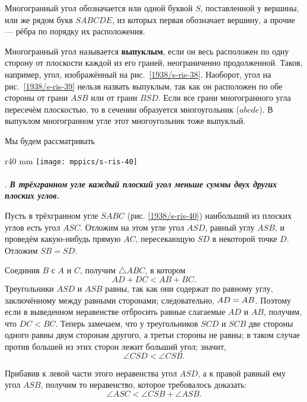 Многогранный угол обозначается или одной буквой $S$, поставленной у вершины, или же рядом букв $SABCDE$, из которых первая обозначает вершину, а прочие — рёбра по порядку их расположения.

Многогранный угол называется \textbf{выпуклым}, если он весь расположен по одну сторону от плоскости каждой из его граней, неограниченно продолженной.
Таков, например, угол, изображённый на рис.~\ref{1938/s-ris-38}.
Наоборот, угол на рис.~\ref{1938/s-ris-39} нельзя назвать выпуклым, так как он расположен по обе стороны от грани $ASB$ или от грани $BSD$.
Если все грани многогранного угла пересечём плоскостью, то в сечении образуется многоугольник ($abcde$).
В выпуклом многогранном угле этот многоугольник тоже выпуклый.

Мы будем рассматривать 

{

\begin{wrapfigure}{r}{40 mm}
\vskip-9mm
\centering
\texttt{[image: mppics/s-ris-40]}
\caption{}\label{1938/s-ris-40}
\end{wrapfigure}

\paragraph{}\label{1938/s50}
\mbox{.}
\textbf{\emph{В трёхгранном угле каждый плоский угол меньше суммы двух других плоских углов.}}

Пусть в трёхгранном угле $SABC$ (рис. \ref{1938/s-ris-40}) наибольший из плоских углов есть угол $ASC$.
Отложим на этом угле угол $ASD$, равный углу $ASB$, и проведём какую-нибудь прямую $AC$, пересекающую $SD$ в некоторой точке $D$.
Отложим $SB=SD$.

}

Соединив $B$ с $A$ и $C$, получим $\triangle ABC$, в котором
\[AD + DC < AB + BC.\]
Треугольники $ASD$ и $ASB$ равны, так как они содержат по равному углу, заключённому между равными сторонами;
следовательно, $AD \z=AB$.
Поэтому если в выведенном неравенстве отбросить равные слагаемые $AD$ и $AB$, получим, что $DC<BC$.
Теперь замечаем, что у треугольников $SCD$ и $SCB$ две стороны одного равны двум сторонам другого, а третьи стороны не равны;
в таком случае против большей из этих сторон лежит больший угол;
значит,
\[\angle CSD < \angle CSB.\]

Прибавив к левой части этого неравенства угол $ASD$, а к правой равный ему угол $ASB$, получим то неравенство, которое требовалось доказать:
\[\angle ASC < \angle CSB + \angle ASB.\]

